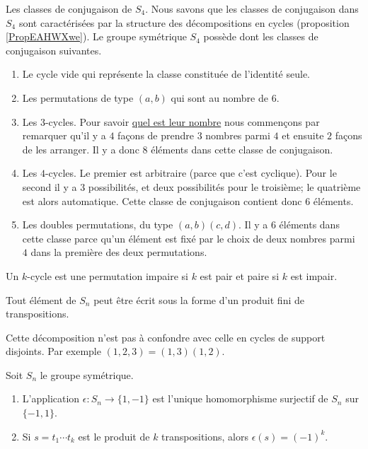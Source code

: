 \begin{example} \label{ExVYZPzub}
    Les classes de conjugaison de \( S_4\). Nous savons que les classes de conjugaison dans \( S_4\) sont caractérisées par la structure des décompositions en cycles (proposition \ref{PropEAHWXwe}). Le groupe symétrique \( S_4\) possède dont les classes de conjugaison suivantes.
\begin{enumerate}
    \item
        Le cycle vide qui représente la classe constituée de l'identité seule.
    \item
        Les permutations de type \( (a,b)\) qui sont au nombre de \( 6\).
    \item
        Les \( 3\)-cycles. Pour savoir \href{http://www.toujourspret.com/techniques/expression/chants/C/cantique_des_etoiles.php}{quel est leur nombre} nous commençons par remarquer qu'il y a \( 4\) façons de prendre \( 3\) nombres parmi \( 4\) et ensuite \( 2\) façons de les arranger. Il y a donc \( 8\) éléments dans cette classe de conjugaison.
    \item
        Les \( 4\)-cycles. Le premier est arbitraire (parce que c'est cyclique). Pour le second il y a \( 3\) possibilités, et deux possibilités pour le troisième; le quatrième est alors automatique. Cette classe de conjugaison contient donc \( 6\) éléments.
    \item
        Les doubles permutations, du type \( (a,b)(c,d)\). Il y a \( 6\) éléments dans cette classe parce qu'un élément est fixé par le choix de deux nombres parmi \( 4\) dans la première des deux permutations.
\end{enumerate}
\end{example}

\begin{lemma}       \label{LemhxnkMf}
    Un \( k\)-cycle est une permutation impaire si \( k\) est pair et paire si \( k\) est impair.
\end{lemma}

\begin{proposition} \label{PropPWIJbu}
    Tout élément de \( S_n\) peut être écrit sous la forme d'un produit fini de transpositions.
\end{proposition}
Cette décomposition n'est pas à confondre avec celle en cycles de support disjoints. Par exemple \( (1,2,3)=(1,3)(1,2)\).

\begin{proposition}  \label{ProphIuJrC}
    Soit \( S_n\) le groupe symétrique.
    \begin{enumerate}
        \item
            L'application \( \epsilon\colon S_n\to \{ 1,-1 \}\) est l'unique homomorphisme surjectif de \( S_n\) sur \( \{ -1,1 \}\).
        \item
            Si \( s=t_1\cdots t_k\) est le produit de \( k\) transpositions, alors \( \epsilon(s)=(-1)^k\).
    \end{enumerate}
\end{proposition}


